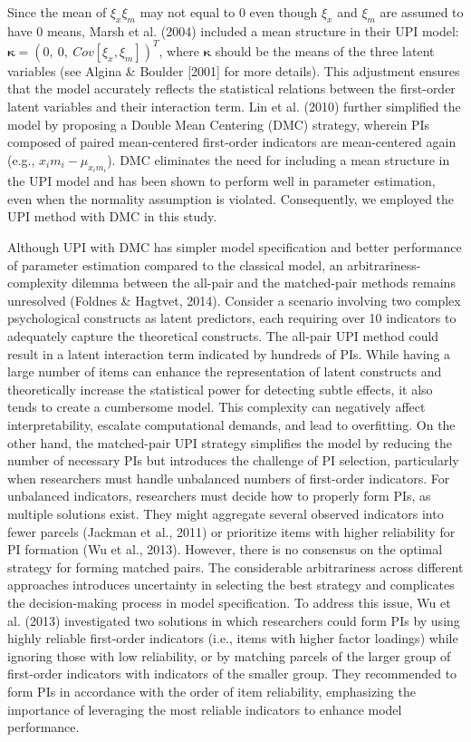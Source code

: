 \documentclass[
  man]{apa6}
\begin{document}
Since the mean of \(\xi_{x}\xi_{m}\) may not equal to 0 even though \(\xi_{x}\) and \(\xi_{m}\) are assumed to have 0 means, Marsh et al. (2004) included a mean structure in their UPI model: \(\mathbf{\kappa} = (0,\ 0,\ Cov[\xi_{x}, \xi_{m}])^T\), where \(\mathbf{\kappa}\) should be the means of the three latent variables (see Algina \& Boulder {[}2001{]} for more details). This adjustment ensures that the model accurately reflects the statistical relations between the first-order latent variables and their interaction term. Lin et al. (2010) further simplified the model by proposing a Double Mean Centering (DMC) strategy, wherein PIs composed of paired mean-centered first-order indicators are mean-centered again (e.g., \(x_{i}m_{i} - \mu_{x_{i}m_{i}}\)). DMC eliminates the need for including a mean structure in the UPI model and has been shown to perform well in parameter estimation, even when the normality assumption is violated. Consequently, we employed the UPI method with DMC in this study.

Although UPI with DMC has simpler model specification and better performance of parameter estimation compared to the classical model, an arbitrariness-complexity dilemma between the all-pair and the matched-pair methods remains unresolved (Foldnes \& Hagtvet, 2014). Consider a scenario involving two complex psychological constructs as latent predictors, each requiring over 10 indicators to adequately capture the theoretical constructs. The all-pair UPI method could result in a latent interaction term indicated by hundreds of PIs. While having a large number of items can enhance the representation of latent constructs and theoretically increase the statistical power for detecting subtle effects, it also tends to create a cumbersome model. This complexity can negatively affect interpretability, escalate computational demands, and lead to overfitting. On the other hand, the matched-pair UPI strategy simplifies the model by reducing the number of necessary PIs but introduces the challenge of PI selection, particularly when researchers must handle unbalanced numbers of first-order indicators. For unbalanced indicators, researchers must decide how to properly form PIs, as multiple solutions exist. They might aggregate several observed indicators into fewer parcels (Jackman et al., 2011) or prioritize items with higher reliability for PI formation (Wu et al., 2013). However, there is no consensus on the optimal strategy for forming matched pairs. The considerable arbitrariness across different approaches introduces uncertainty in selecting the best strategy and complicates the decision-making process in model specification. To address this issue, Wu et al. (2013) investigated two solutions in which researchers could form PIs by using highly reliable first-order indicators (i.e., items with higher factor loadings) while ignoring those with low reliability, or by matching parcels of the larger group of first-order indicators with indicators of the smaller group. They recommended to form PIs in accordance with the order of item reliability, emphasizing the importance of leveraging the most reliable indicators to enhance model performance.
\end{document}
